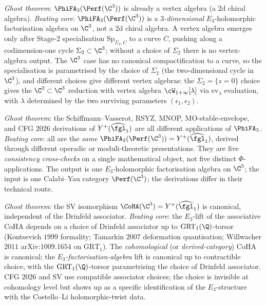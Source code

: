 \begin{remark}
\label{rem:ghost-theorem-3-wave10}
\emph{Ghost theorem}: $\PhiFA_3(\Perf(\C^3))$ is already a vertex
algebra (a $2$d chiral algebra). \emph{Beating core}:
$\PhiFA_3(\Perf(\C^3))$ is a \emph{$3$-dimensional} $E_3$-holomorphic
factorisation algebra on $\C^3$, not a $2$d chiral algebra. A vertex
algebra emerges only after Stage-$2$ specialisation
$\mathrm{Sp}_{\Sigma_2, C}$ to a curve $C$, pushing along a codimension-one
cycle $\Sigma_2 \subset \C^3$; without a choice of $\Sigma_2$ there is
no vertex-algebra output. The $\C^3$ case has no canonical
compactification to a curve, so the specialisation is parametrised by
the choice of $\Sigma_2$ (the two-dimensional cycle in $\C^3$), and
different choices give different vertex algebras: the
$\Sigma_2 = \{z = 0\}$ choice gives the $\C^2 \subset \C^3$ reduction
with vertex algebra $\cW_{1+\infty}[\lambda]$ via $\mathrm{ev}_\lambda$
evaluation, with $\lambda$ determined by the two surviving parameters
$(\epsilon_1, \epsilon_2)$.
\end{remark}

\begin{remark}
\label{rem:ghost-theorem-4-wave10}
\emph{Ghost theorem}: the Schiffmann--Vasserot, RSYZ, MNOP, MO-stable-envelope,
and CFG $2026$ derivations of $Y^+(\widehat{\fgl}_1)$ are all different
applications of $\PhiFA_3$. \emph{Beating core}: all are the \emph{same}
$\PhiFA_3(\Perf(\C^3)) = Y^+(\widehat{\fgl}_1)$, derived through
different operadic or moduli-theoretic presentations. They are five
\emph{consistency cross-checks} on a single mathematical object, not
five distinct $\Phi$-applications. The output is one $E_3$-holomorphic
factorisation algebra on $\C^3$; the input is one Calabi--Yau category
$\Perf(\C^3)$; the derivations differ in their technical route.
\end{remark}

\begin{remark}
\label{rem:ghost-theorem-5-wave10}
\emph{Ghost theorem}: the SV isomorphism $\CoHA(\C^3) =
Y^+(\widehat{\fgl}_1)$ is canonical, independent of the Drinfeld
associator. \emph{Beating core}: the $E_3$-lift of the associative
CoHA depends on a choice of Drinfeld associator up to
$\mathrm{GRT}_1(\Q)$-torsor (Kontsevich $1999$ formality; Tamarkin
$2007$ deformation quantisation; Willwacher $2011$ arXiv:$1009.1654$
on $\mathrm{GRT}_1$). The \emph{cohomological} (or
\emph{derived-category}) CoHA is canonical; the \emph{$E_3$-factorisation-algebra}
lift is canonical up to contractible choice, with the $\mathrm{GRT}_1(\Q)$-torsor
parametrising the choice of Drinfeld associator. CFG $2026$ and SV
use compatible associator choices; the choice is invisible at cohomology
level but shows up as a specific identification of the $E_3$-structure
with the Costello--Li holomorphic-twist data.
\end{remark}

